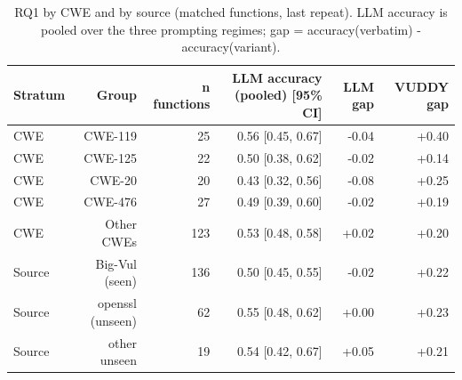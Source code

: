 \begin{table}[t]
\centering\small
\caption{RQ1 by CWE and by source (matched functions, last repeat). LLM accuracy is pooled over the three prompting regimes; gap = accuracy(verbatim) - accuracy(variant).}
\label{tab:t2}
\begin{tabular}{lrrrrr}
\toprule
Stratum & Group & n functions & LLM accuracy (pooled) [95\% CI] & LLM gap & VUDDY gap \\
\midrule
CWE & CWE-119 & 25 & 0.56 [0.45, 0.67] & -0.04 & +0.40 \\
CWE & CWE-125 & 22 & 0.50 [0.38, 0.62] & -0.02 & +0.14 \\
CWE & CWE-20 & 20 & 0.43 [0.32, 0.56] & -0.08 & +0.25 \\
CWE & CWE-476 & 27 & 0.49 [0.39, 0.60] & -0.02 & +0.19 \\
CWE & Other CWEs & 123 & 0.53 [0.48, 0.58] & +0.02 & +0.20 \\
Source & Big-Vul (seen) & 136 & 0.50 [0.45, 0.55] & -0.02 & +0.22 \\
Source & openssl (unseen) & 62 & 0.55 [0.48, 0.62] & +0.00 & +0.23 \\
Source & other unseen & 19 & 0.54 [0.42, 0.67] & +0.05 & +0.21 \\
\bottomrule
\end{tabular}
\end{table}
